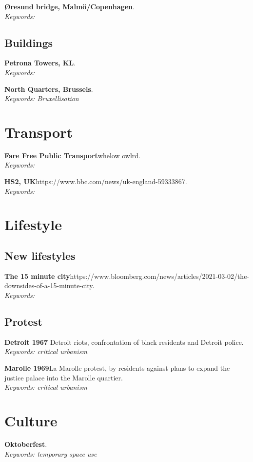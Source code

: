 \documentclass{article}
\newcommand{\entry}[3]{\textbf{#1}\quad #2. \\\textit{Keywords: #3}}
\begin{document}
\entry{Øresund bridge, Malmö/Copenhagen}{}{}

\subsection{Buildings}

\entry{Petrona Towers, KL}{}{}


\entry{North Quarters, Brussels}{}{Bruxellisation}

\section{Transport}

\entry{Fare Free Public Transport}{whelow owlrd}{}

\entry{HS2, UK}{https://www.bbc.com/news/uk-england-59333867}{}

\section{Lifestyle}

\subsection{New lifestyles}

\entry{The 15 minute city}{https://www.bloomberg.com/news/articles/2021-03-02/the-downsides-of-a-15-minute-city}{}

\subsection{Protest}

\entry{Detroit 1967}{ Detroit riots, confrontation of black residents and Detroit police}{critical urbanism}

\entry{Marolle 1969}{La Marolle protest, by residents against plans to expand the justice palace into the Marolle quartier}{critical urbanism}



\section{Culture}

\entry{Oktoberfest}{}{temporary space use}
\end{document}
